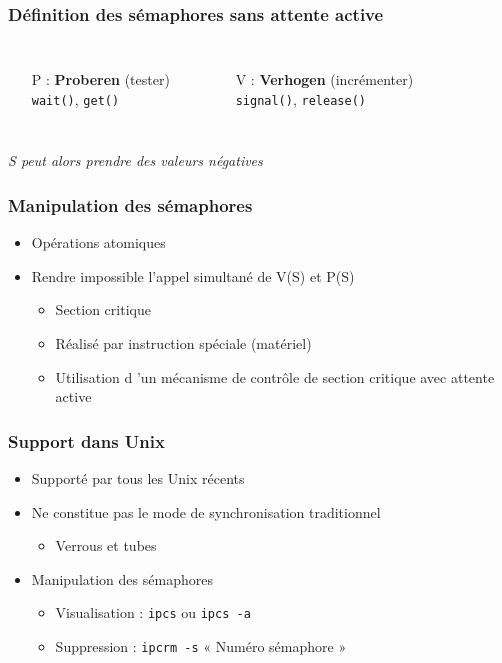 \begin{frame}
\frametitle{Définition des sémaphores sans attente active}
\begin{columns}
\begin{itemize}
\item[P] : \textbf{Proberen} (tester)\\ \texttt{wait()}, \texttt{get()}
\end{itemize}
\begin{small}\end{small}
\begin{itemize}
\item[V] : \textbf{Verhogen} (incrémenter)\\ \texttt{signal()}, \texttt{release()}
\end{itemize}
\begin{small}\end{small}
\end{columns}
\begin{block}{}
\begin{center}
\textit{S peut alors prendre des valeurs négatives}
\end{center}
\end{block}
\end{frame}

\begin{frame}
\frametitle{Manipulation des sémaphores}
\begin{itemize}
\item Opérations atomiques
\item Rendre impossible l’appel simultané de V(S) et P(S)
\begin{itemize}
\item Section critique
\item Réalisé par instruction spéciale (matériel)
\item Utilisation d ’un mécanisme de contrôle de section critique avec attente active
\end{itemize}
\end{itemize}
\end{frame}

\begin{frame}
\frametitle{Support dans Unix}
\begin{itemize}
\item Supporté par tous les Unix récents
\item Ne constitue pas le mode de synchronisation traditionnel 
\begin{itemize}
\item Verrous et tubes
\end{itemize}
\item Manipulation des sémaphores
\begin{itemize}
\item Visualisation : \texttt{ipcs} ou \texttt{ipcs -a}
\item Suppression : \texttt{ipcrm -s} « Numéro sémaphore »
\end{itemize}
\end{itemize}
\end{frame}

